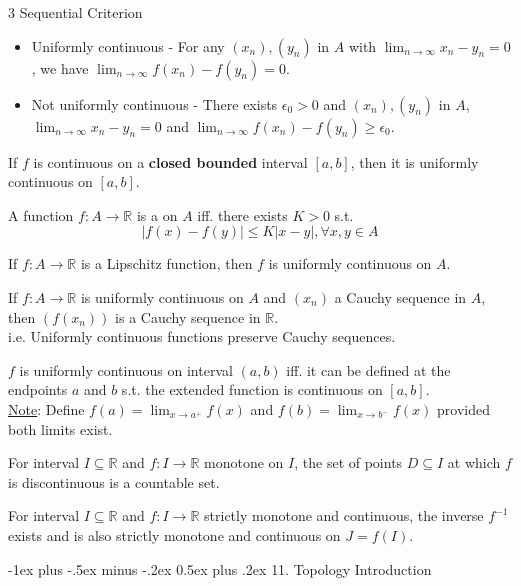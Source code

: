 \documentclass[10pt,landscape,letterpaper]{article}
\makeatletter
\renewcommand{\section}{\@startsection{section}{1}{0mm}%
                                {-1ex plus -.5ex minus -.2ex}%
                                {0.5ex plus .2ex}%
                                {\sffamily\large}}
\makeatother
\begin{document}
\begin{multicols}{3}
Sequential Criterion
\begin{itemize}
    \item Uniformly continuous - For any $(x_n), (y_n)$ in $A$ with $\lim_{n\to \infty} x_n - y_n = 0$, we have $\lim_{n \to \infty} f(x_n) - f(y_n) = 0$.
    \item Not uniformly continuous - There exists $\epsilon_0 > 0$ and $(x_n), (y_n)$ in $A$, $\lim_{n\to \infty} x_n - y_n = 0$ and $\lim_{n \to \infty} f(x_n) - f(y_n) \ge \epsilon_0$.
\end{itemize}


 If $f$ is continuous on a \textbf{closed bounded} interval $[a, b]$, then it is uniformly continuous on $[a, b]$.


\smallbreak


A function $f: A \to \mathbb{R}$ is a  on $A$ iff. there exists $K > 0$ s.t.
\[
|f(x) - f(y)| \le K |x-y|, \forall x, y \in A
\]

 If $f: A \to \mathbb{R}$ is a Lipschitz function, then $f$ is uniformly continuous on $A$.


 If $f: A \to \mathbb{R}$ is uniformly continuous on $A$ and $(x_n)$ a Cauchy sequence in $A$, then $(f(x_n))$ is a Cauchy sequence in $\mathbb{R}$.
\\
i.e. Uniformly continuous functions preserve Cauchy sequences.



 $f$ is uniformly continuous on interval $(a, b)$ iff. it can be defined at the endpoints $a$ and $b$ s.t. the extended function is continuous on $[a, b]$.
\\
\underline{Note}: Define $f(a) = \lim_{x \to a^+} f(x)$ and $f(b) = \lim_{x \to b^-} f(x)$ provided both limits exist.



 For interval $I \subseteq \mathbb{R}$ and $f: I \to \mathbb{R}$ monotone on $I$, the set of points $D \subseteq I$ at which $f$ is discontinuous is a countable set.


 For interval $I \subseteq \mathbb{R}$ and $f: I \to \mathbb{R}$ strictly monotone and continuous, the inverse $f^{-1}$ exists and is also strictly monotone and continuous on $J = f(I)$.




\section{11. Topology Introduction}

\end{multicols}
\end{document}
